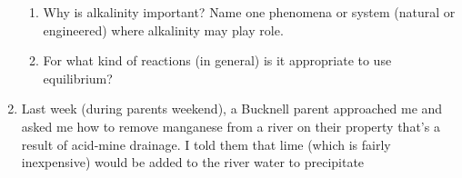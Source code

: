\documentclass[12pt,letterpaper]{article}
\begin{document}
\begin{enumerate}
\begin{enumerate}
\item Why is alkalinity important?  Name one phenomena or system (natural or engineered) where alkalinity may play role.
\item For what kind of reactions (in general) is it appropriate to use equilibrium?


\end{enumerate}

\item Last week (during parents weekend), a Bucknell parent approached me and asked me how to remove manganese from a river on their property that's a result of acid-mine drainage.  I told them that lime (which is fairly inexpensive) would be added to the river water to precipitate 

\end{enumerate}
\end{document}
